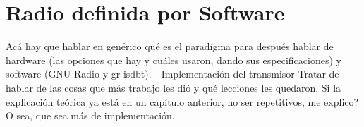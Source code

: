 \chapter{Radio definida por Software}

Acá hay que hablar en genérico qué es el paradigma para después hablar de hardware (las opciones que hay y cuáles usaron, dando sus especificaciones) y software (GNU Radio y gr-isdbt). 
- Implementación del transmisor
Tratar de hablar de las cosas que más trabajo les dió y qué lecciones les quedaron. Si la explicación teórica ya está en un capítulo anterior, no ser repetitivos, me explico? O sea, que sea más de implementación. 